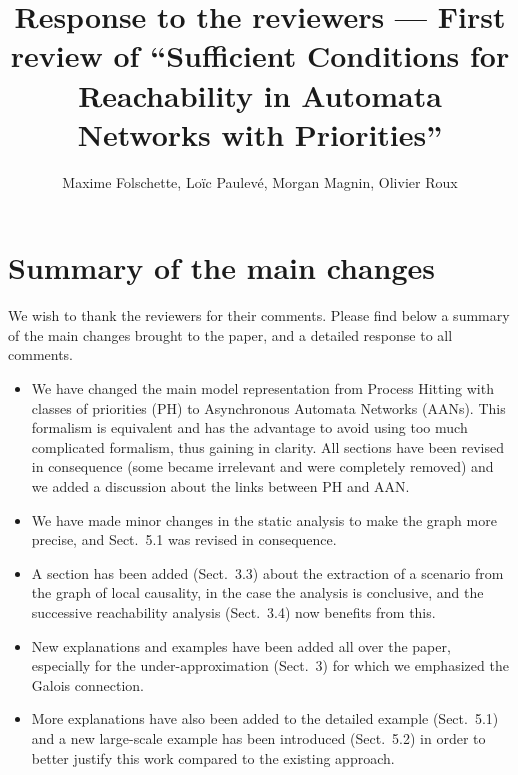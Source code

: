\documentclass[11pt]{article}
\title{Response to the reviewers --- First review of “Sufficient Conditions for Reachability in Automata Networks with Priorities”}
\author{Maxime Folschette, Loïc Paulevé, Morgan Magnin, Olivier Roux}
\date{}
\newcommand{\answer}[1]{\textcolor{blue}{#1}\vspace*{1em}}
\begin{document}
\maketitle




\section*{Summary of the main changes}

We wish to thank the reviewers for their comments.
Please find below a summary of the main changes brought to the paper, and a detailed response to all comments.

\begin{itemize}
  \item We have changed the main model representation from Process Hitting
    with classes of priorities (PH) to Asynchronous Automata Networks (AANs).
    This formalism is equivalent
    and has the advantage to avoid using too much complicated formalism,
    thus gaining in clarity.
    All sections have been revised in consequence
    (some became irrelevant and were completely removed)
    and we added a discussion about the links between PH and AAN.
  \item We have made minor changes in the static analysis to make the graph more precise,
    and Sect.~5.1 was revised in consequence.
  \item A section has been added (Sect.~3.3) about the extraction of a scenario
    from the graph of local causality, in the case the analysis is conclusive,
    and the successive reachability analysis (Sect.~3.4) now benefits from this.
  \item New explanations and examples have been added all over the paper,
    especially for the under-approximation (Sect.~3)
    for which we emphasized the Galois connection.
  \item More explanations have also been added to the detailed example (Sect.~5.1)
    and a new large-scale example has been introduced (Sect.~5.2)
    in order to better justify this work compared to the existing approach.
\end{itemize}
\end{document}
